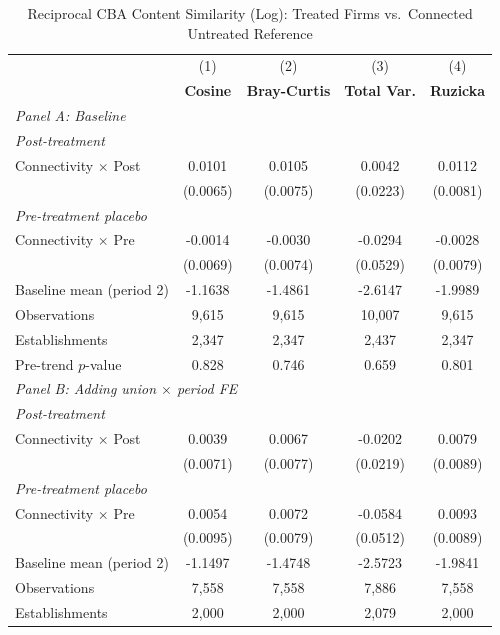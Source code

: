 \begin{table}[H]
\centering
\caption{Reciprocal CBA Content Similarity (Log): Treated Firms vs.\ Connected Untreated Reference}
\label{tab:treated_ln_cba_similarity}
\scriptsize
\setlength{\tabcolsep}{8pt}
\begin{tabular}{lcccc}
\toprule\toprule
 & (1) & (2) & (3) & (4) \\
 & \textbf{Cosine} & \textbf{Bray-Curtis} & \textbf{Total Var.} & \textbf{Ruzicka} \\
\midrule
\multicolumn{5}{l}{\textit{Panel A: Baseline}} \\
\multicolumn{5}{l}{\textit{Post-treatment}} \\
Connectivity $\times$ Post & 0.0101 & 0.0105 & 0.0042 & 0.0112 \\
 & (0.0065) & (0.0075) & (0.0223) & (0.0081) \\
\multicolumn{5}{l}{\textit{Pre-treatment placebo}} \\
Connectivity $\times$ Pre & -0.0014 & -0.0030 & -0.0294 & -0.0028 \\
 & (0.0069) & (0.0074) & (0.0529) & (0.0079) \\
\midrule
Baseline mean (period 2) & -1.1638 & -1.4861 & -2.6147 & -1.9989 \\
Observations &        9,615 &        9,615 &       10,007 &        9,615 \\
Establishments &        2,347 &        2,347 &        2,437 &        2,347 \\
Pre-trend $p$-value & 0.828 & 0.746 & 0.659 & 0.801 \\
\midrule
\multicolumn{5}{l}{\textit{Panel B: Adding union $\times$ period FE}} \\
\multicolumn{5}{l}{\textit{Post-treatment}} \\
Connectivity $\times$ Post & 0.0039 & 0.0067 & -0.0202 & 0.0079 \\
 & (0.0071) & (0.0077) & (0.0219) & (0.0089) \\
\multicolumn{5}{l}{\textit{Pre-treatment placebo}} \\
Connectivity $\times$ Pre & 0.0054 & 0.0072 & -0.0584 & 0.0093 \\
 & (0.0095) & (0.0079) & (0.0512) & (0.0089) \\
\midrule
Baseline mean (period 2) & -1.1497 & -1.4748 & -2.5723 & -1.9841 \\
Observations &        7,558 &        7,558 &        7,886 &        7,558 \\
Establishments &        2,000 &        2,000 &        2,079 &        2,000 \\

\end{tabular}
\end{table}
